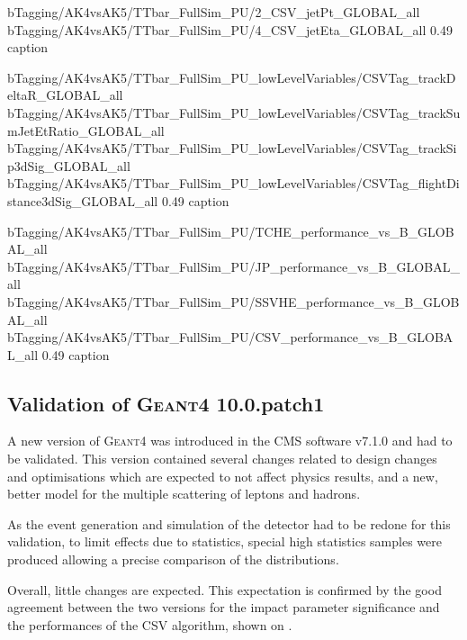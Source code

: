                          {bTagging/AK4vsAK5/TTbar_FullSim_PU/2_CSV_jetPt_GLOBAL_all}
                         {bTagging/AK4vsAK5/TTbar_FullSim_PU/4_CSV_jetEta_GLOBAL_all}
                         {0.49}
                         {caption}

                          {bTagging/AK4vsAK5/TTbar_FullSim_PU_lowLevelVariables/CSVTag_trackDeltaR_GLOBAL_all}
                          {bTagging/AK4vsAK5/TTbar_FullSim_PU_lowLevelVariables/CSVTag_trackSumJetEtRatio_GLOBAL_all}
                          {bTagging/AK4vsAK5/TTbar_FullSim_PU_lowLevelVariables/CSVTag_trackSip3dSig_GLOBAL_all}
                          {bTagging/AK4vsAK5/TTbar_FullSim_PU_lowLevelVariables/CSVTag_flightDistance3dSig_GLOBAL_all}
                          {0.49}
                          {caption}

                          {bTagging/AK4vsAK5/TTbar_FullSim_PU/TCHE_performance_vs_B_GLOBAL_all}
                          {bTagging/AK4vsAK5/TTbar_FullSim_PU/JP_performance_vs_B_GLOBAL_all}
                          {bTagging/AK4vsAK5/TTbar_FullSim_PU/SSVHE_performance_vs_B_GLOBAL_all}
                          {bTagging/AK4vsAK5/TTbar_FullSim_PU/CSV_performance_vs_B_GLOBAL_all}
                          {0.49}
                          {caption}

        \subsection{Validation of \textsc{Geant4} 10.0.patch1}

        A new version of \textsc{Geant4} was introduced in the CMS software v7.1.0 and
        had to be validated. This version contained several changes related to design
        changes and optimisations which are expected to not affect physics results,
        and a new, better model for the multiple scattering of leptons and hadrons.

        As the event generation and simulation of the detector had to be redone for
        this validation, to limit effects due to statistics, special high statistics
        samples were produced allowing a precise comparison of the distributions.

        Overall, little changes are expected. This expectation is confirmed by the
        good agreement between the two versions for the impact parameter significance and
        the performances of the CSV algorithm, shown on .

